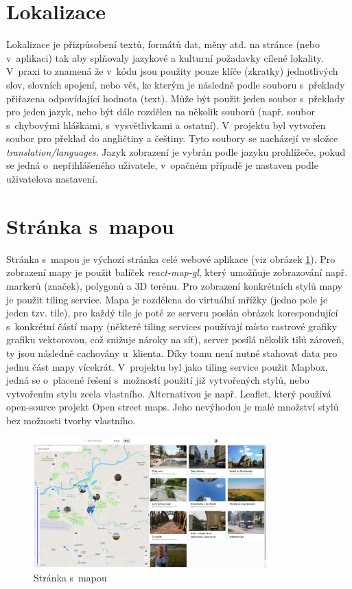 \documentclass[12pt, a4paper,
  oneside,      %
]{report}
\begin{document}
\section{Lokalizace}
Lokalizace je přizpůsobení textů, formátů dat, měny atd. na stránce (nebo v~aplikaci) tak aby splňovaly jazykové a kulturní požadavky cílené lokality. V~praxi to znamená že v~kódu jsou použity pouze klíče (zkratky) jednotlivých slov, slovních spojení, nebo vět, ke kterým je následně podle souboru s~překlady přiřazena odpovídající hodnota (text). Může být použit jeden soubor s~překlady pro jeden jazyk, nebo být dále rozdělen na několik souborů (např. soubor s~chybovými hláškami, s~vysvětlivkami a ostatní). V~projektu byl vytvořen soubor pro překlad do angličtiny a češtiny. Tyto soubory se nacházejí ve složce \textit{translation/languages}. Jazyk zobrazení je vybrán podle jazyku prohlížeče, pokud se jedná o~nepřihlášeného uživatele, v~opačném případě je nastaven podle uživatelova nastavení. \cite{internationalizationVsLocalization}


\section{Stránka s~mapou}
Stránka s~mapou je výchozí stránka celé webové aplikace (viz obrázek \ref{figure:mapPagePreview}). Pro zobrazení mapy je použit balíček \textit{react-map-gl}, který umožňuje zobrazování např. markerů (značek), polygonů a 3D terénu. Pro zobrazení konkrétních stylů mapy je použit tiling service. Mapa je rozdělena do virtuální mřížky (jedno pole je jeden tzv. tile), pro každý tile je poté ze serveru poslán obrázek korespondující s~konkrétní částí mapy (některé tiling services používají místo rastrové grafiky grafiku vektorovou, což snižuje nároky na síť), server posílá několik tilů zároveň, ty jsou následně cachovány u~klienta. Díky tomu není nutné stahovat data pro jednu část mapy vícekrát. V~projektu byl jako tiling service použit Mapbox, jedná se o~placené řešení s~možností použití již vytvořených stylů, nebo vytvořením stylu zcela vlastního. Alternativou je např. Leaflet, který používá open-source projekt Open street maps. Jeho nevýhodou je malé množství stylů bez možnosti tvorby vlastního.

\begin{figure}[h]
	\centering
	\includegraphics[width=0.8\textwidth]{images/map_page.png}
	\caption{Stránka s~mapou}\label{figure:mapPagePreview}
\end{figure}
\end{document}
